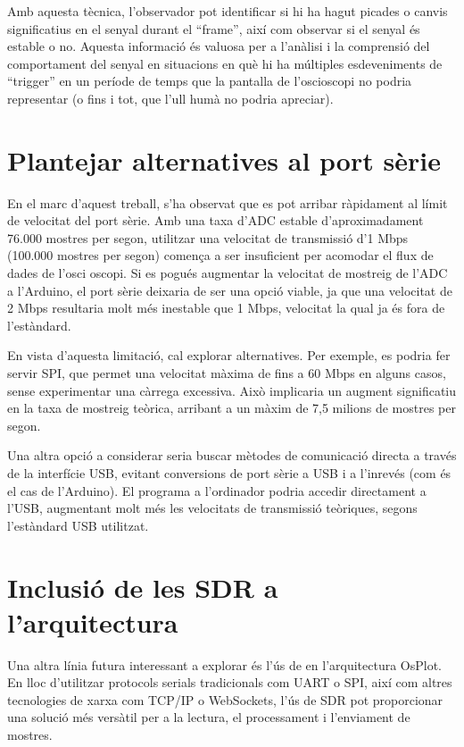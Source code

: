 \documentclass{tfgitic}[2023/06/30]
\begin{document}
Amb aquesta tècnica, l'observador pot identificar si hi ha hagut
picades o canvis significatius en el senyal durant el ``frame'', així
com observar si el senyal és estable o no. Aquesta informació és
valuosa per a l'anàlisi i la comprensió del comportament del senyal en
situacions en què hi ha múltiples esdeveniments de ``trigger'' en un
període de temps que la pantalla de l'osci\lgem oscopi no podria
representar (o fins i tot, que l'ull humà no podria apreciar).

\section{Plantejar alternatives al port sèrie}

En el marc d'aquest treball, s'ha observat que es pot arribar
ràpidament al límit de velocitat del port sèrie. Amb una taxa d'ADC
estable d'aproximadament 76.000 mostres per segon, utilitzar una
velocitat de transmissió d'1 Mbps (100.000 mostres per segon) comença
a ser insuficient per acomodar el flux de dades de l'osci\lgem
oscopi. Si es pogués augmentar la velocitat de mostreig de l'ADC a
l'Arduino, el port sèrie deixaria de ser una opció viable, ja que una
velocitat de 2 Mbps resultaria molt més inestable que 1 Mbps,
velocitat la qual ja és fora de l'estàndard.

En vista d'aquesta limitació, cal explorar alternatives. Per exemple,
es podria fer servir SPI, que permet una velocitat màxima de fins a 60
Mbps en alguns casos, sense experimentar una càrrega excessiva. Això
implicaria un augment significatiu en la taxa de mostreig teòrica,
arribant a un màxim de 7,5 milions de mostres per segon.

Una altra opció a considerar seria buscar mètodes de comunicació
directa a través de la interfície USB, evitant conversions de port
sèrie a USB i a l'inrevés (com és el cas de l'Arduino). El programa a
l'ordinador podria accedir directament a l'USB, augmentant molt més
les velocitats de transmissió teòriques, segons l'estàndard USB
utilitzat.

\section{Inclusió de les SDR a l'arquitectura}

Una altra línia futura interessant a explorar és l'ús de \cite[Ràdio
 Definida per Software]{viqui-sdr} en l'arquitectura OsPlot. En lloc
d'utilitzar protocols serials tradicionals com UART o SPI, així com
altres tecnologies de xarxa com TCP/IP o WebSockets, l'ús de SDR pot
proporcionar una solució més versàtil per a la lectura, el
processament i l'enviament de mostres.
\end{document}
